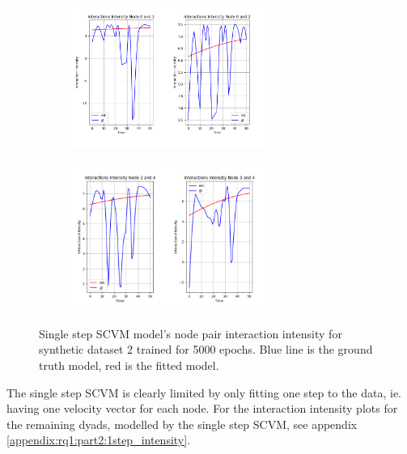 \begin{figure}[H]
    \centering
    \begin{subfigure}[b]{\textwidth}
        \centering
        \includegraphics[width=0.7\textwidth]{0_images/rq1_2_1step_intensity_plot_node_01_02.PNG}
    \end{subfigure}
    \vfill
    \begin{subfigure}[b]{\textwidth}
        \centering
        \includegraphics[width=0.7\textwidth]{0_images/rq1_2_1step_intensity_plot_node_23_34.PNG}
    \end{subfigure}
    \caption{Single step SCVM model's node pair interaction intensity for synthetic dataset 2 trained for 5000 epochs. Blue line is the ground truth model, red is the fitted model.}
    \label{fig:RQ1:part2:1step_intensity}
\end{figure}
\vspace*{-0.1cm}
\noindent
The single step SCVM is clearly limited by only fitting one step to the data, ie. having one velocity vector for each node.
For the interaction intensity plots for the remaining dyads, modelled by the single step SCVM, see appendix \ref{appendix:rq1:part2:1step_intensity}.
\\\\
